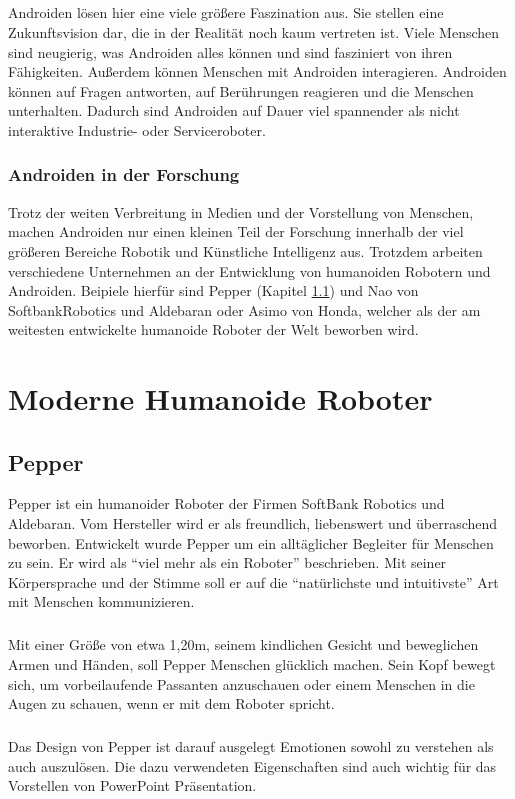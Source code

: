 \subparagraph{}
Androiden lösen hier eine viele größere Faszination aus. Sie
stellen eine Zukunftsvision dar, die in der Realität noch kaum vertreten ist.
Viele Menschen sind neugierig, was Androiden alles können und sind fasziniert
von ihren Fähigkeiten. Außerdem können Menschen mit Androiden interagieren.
Androiden können auf Fragen antworten, auf Berührungen reagieren und die
Menschen unterhalten. Dadurch sind Androiden auf Dauer viel spannender als nicht
interaktive Industrie- oder Serviceroboter.

\subsubsection{Androiden in der Forschung}
Trotz der weiten Verbreitung in Medien und der Vorstellung von
Menschen, machen Androiden nur einen kleinen Teil der Forschung innerhalb der
viel größeren Bereiche Robotik und Künstliche Intelligenz aus.
\cite{Dautenhahn2011} Trotzdem arbeiten verschiedene Unternehmen an der
Entwicklung von humanoiden Robotern und Androiden. Beipiele hierfür sind Pepper
(Kapitel \ref{sec:pepper}) und Nao von SoftbankRobotics und Aldebaran oder Asimo
von Honda, welcher als der am weitesten entwickelte humanoide Roboter der Welt
beworben wird. \cite{Honda2018}

\section{Moderne Humanoide Roboter}
\subsection{Pepper}\label{sec:pepper}
Pepper ist ein humanoider Roboter der Firmen SoftBank Robotics und Aldebaran.
Vom Hersteller wird er als freundlich, liebenswert und überraschend beworben.
Entwickelt wurde Pepper um ein alltäglicher Begleiter für Menschen zu sein. Er
wird als "`viel mehr als ein Roboter"' beschrieben. Mit seiner Körpersprache und
der Stimme soll er auf die "`natürlichste und intuitivste"' Art mit Menschen
kommunizieren. \cite{SoftBank2018}

\subparagraph{}
Mit einer Größe von etwa 1,20m, seinem kindlichen Gesicht und beweglichen Armen
und Händen, soll Pepper Menschen glücklich machen. Sein Kopf bewegt sich, um
vorbeilaufende Passanten anzuschauen oder einem Menschen in die Augen zu
schauen, wenn er mit dem Roboter spricht. \cite{Markowitz2015}

\subparagraph{}
Das Design von Pepper ist darauf ausgelegt Emotionen sowohl zu verstehen als
auch auszulösen. Die dazu verwendeten Eigenschaften sind auch wichtig für das
Vorstellen von PowerPoint Präsentation.

